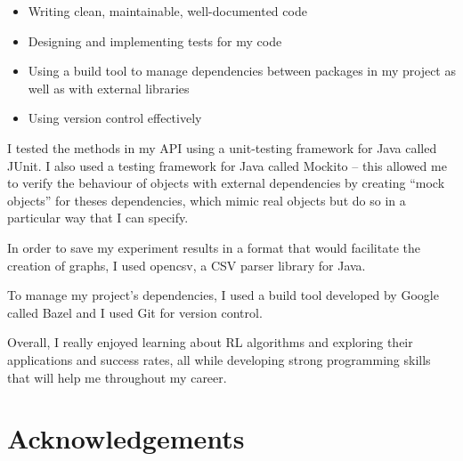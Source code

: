 \documentclass[11pt,a4paper]{report}
\begin{document}
\begin{itemize}
	\item Writing clean, maintainable, well-documented code
	\item Designing and implementing tests for my code
	\item Using a build tool to manage dependencies between packages in my project as well as with external libraries
	\item Using version control effectively
\end{itemize}

I tested the methods in my API using a unit-testing framework for Java called JUnit. I also used a testing framework for Java called Mockito – this allowed me to verify the behaviour of objects with external dependencies by creating “mock objects” for theses dependencies, which mimic real objects but do so in a particular way that I can specify.

In order to save my experiment results in a format that would facilitate the creation of graphs, I used opencsv, a CSV parser library for Java.

To manage my project’s dependencies, I used a build tool developed by Google called Bazel and I used Git for version control.

Overall, I really enjoyed learning about RL algorithms and exploring their applications and success rates, all while developing strong programming skills that will help me throughout my career.


\chapter{Acknowledgements}



{}

\end{document}

